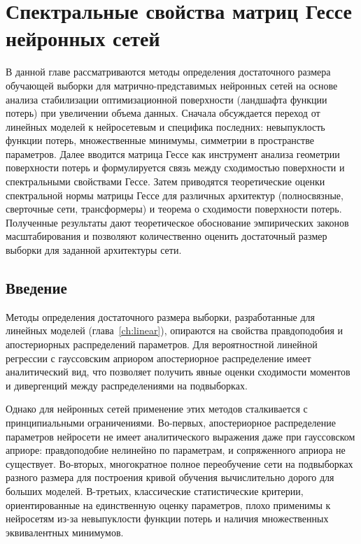 \chapter{Спектральные свойства матриц Гессе нейронных сетей}\label{ch:hessian}

В данной главе рассматриваются методы определения достаточного размера обучающей выборки для матрично-представимых нейронных сетей на основе анализа стабилизации оптимизационной поверхности (ландшафта функции потерь) при увеличении объема данных. Сначала обсуждается переход от линейных моделей к нейросетевым и специфика последних: невыпуклость функции потерь, множественные минимумы, симметрии в пространстве параметров. Далее вводится матрица Гессе как инструмент анализа геометрии поверхности потерь и формулируется связь между сходимостью поверхности и спектральными свойствами Гессе. Затем приводятся теоретические оценки спектральной нормы матрицы Гессе для различных архитектур (полносвязные, сверточные сети, трансформеры) и теорема о сходимости поверхности потерь. Полученные результаты дают теоретическое обоснование эмпирических законов масштабирования и позволяют количественно оценить достаточный размер выборки для заданной архитектуры сети.

\section{Введение}

Методы определения достаточного размера выборки, разработанные для линейных моделей (глава~\ref{ch:linear}), опираются на свойства правдоподобия и апостериорных распределений параметров. Для вероятностной линейной регрессии с гауссовским априором апостериорное распределение имеет аналитический вид, что позволяет получить явные оценки сходимости моментов и дивергенций между распределениями на подвыборках.

Однако для нейронных сетей применение этих методов сталкивается с принципиальными ограничениями. Во-первых, апостериорное распределение параметров нейросети не имеет аналитического выражения даже при гауссовском априоре: правдоподобие нелинейно по параметрам, и сопряженного априора не существует. Во-вторых, многократное полное переобучение сети на подвыборках разного размера для построения кривой обучения вычислительно дорого для больших моделей. В-третьих, классические статистические критерии, ориентированные на единственную оценку параметров, плохо применимы к нейросетям из-за невыпуклости функции потерь и наличия множественных эквивалентных минимумов.

